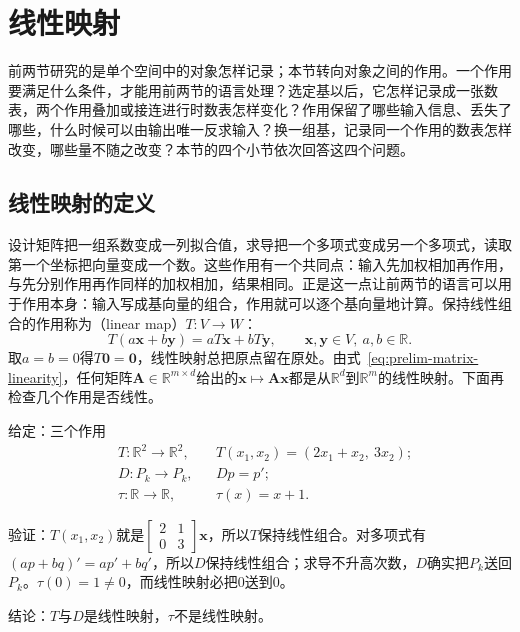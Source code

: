 
\section{线性映射}
\label{sec:ls-linear-maps}
\label{sec:linear-algebra-matrices-linear-maps}

前两节研究的是单个空间中的对象怎样记录；本节转向对象之间的作用。一个作用要满足什么条件，才能用前两节的语言处理？选定基以后，它怎样记录成一张数表，两个作用叠加或接连进行时数表怎样变化？作用保留了哪些输入信息、丢失了哪些，什么时候可以由输出唯一反求输入？换一组基，记录同一个作用的数表怎样改变，哪些量不随之改变？本节的四个小节依次回答这四个问题。

\subsection{线性映射的定义}
\label{sec:ls-linear-map-definition}
\label{sec:linear-algebra-maps}

设计矩阵把一组系数变成一列拟合值，求导把一个多项式变成另一个多项式，读取第一个坐标把向量变成一个数。这些作用有一个共同点：输入先加权相加再作用，与先分别作用再作同样的加权相加，结果相同。正是这一点让前两节的语言可以用于作用本身：输入写成基向量的组合，作用就可以逐个基向量地计算。保持线性组合的作用称为（linear map）$T:V\to W$：
\begin{equation}
 T(a\bm x+b\bm y)=aT\bm x+bT\bm y,
 \qquad \bm x,\bm y\in V,\ a,b\in\mathbb R.
 \label{eq:ls-linear-map-def}
\end{equation}
取$a=b=0$得$T\bm0=\bm0$，线性映射总把原点留在原处。由式~\eqref{eq:prelim-matrix-linearity}，任何矩阵$\bm A\in\mathbb R^{m\times d}$给出的$\bm x\mapsto\bm A\bm x$都是从$\mathbb R^d$到$\mathbb R^m$的线性映射。下面再检查几个作用是否线性。
\begin{example}[线性与非线性的作用]
\label{ex:ls-linear-map-checks}
给定：三个作用
\[
 \begin{aligned}
 &T:\mathbb R^2\to\mathbb R^2, &&T(x_1,x_2)=(2x_1+x_2,\ 3x_2);\\
 &D:P_k\to P_k, &&Dp=p';\\
 &\tau:\mathbb R\to\mathbb R, &&\tau(x)=x+1.
 \end{aligned}
\]

验证：$T(x_1,x_2)$就是$\left[\begin{smallmatrix}2&1\\0&3\end{smallmatrix}\right]\bm x$，所以$T$保持线性组合。对多项式有$(ap+bq)'=ap'+bq'$，所以$D$保持线性组合；求导不升高次数，$D$确实把$P_k$送回$P_k$。$\tau(0)=1\neq0$，而线性映射必把$0$送到$0$。

结论：$T$与$D$是线性映射，$\tau$不是线性映射。
\end{example}

